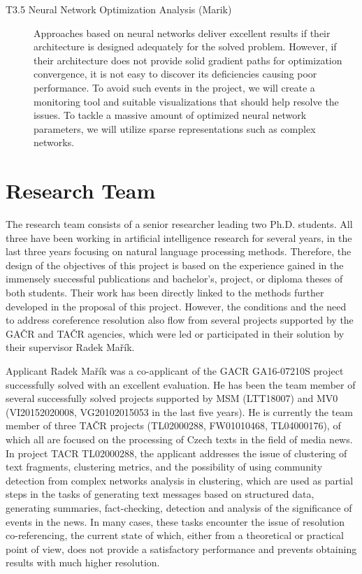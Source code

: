 \begin{description}
	\item [T3.5 Neural Network Optimization Analysis  (Marik)] Approaches based on neural networks deliver excellent results if their architecture is designed adequately for the solved problem. However, if their architecture does not provide solid gradient paths for optimization convergence, it is not easy to discover its deficiencies causing poor performance. To avoid such events in the project, we will create a monitoring tool and suitable visualizations that should help resolve the issues. To tackle a massive amount of optimized neural network parameters, we will utilize sparse representations such as complex networks.

\end{description}


\section{Research Team}\label{sec:research_team}

The research team consists of a senior researcher leading two Ph.D. students. All three have been working in artificial intelligence research for several years, in the last three years focusing on natural language processing methods. Therefore, the design of the objectives of this project is based on the experience gained in the immensely successful publications and bachelor's, project, or diploma theses of both students. Their work has been directly linked to the methods further developed in the proposal of this project. However, the conditions and the need to address coreference resolution also flow from several projects supported by the GAČR and TAČR agencies, which were led or participated in their solution by their supervisor Radek Mařík.

Applicant Radek Mařík was a co-applicant of the GACR GA16-07210S project successfully solved with an excellent evaluation. He has been the team member of several successfully solved projects supported by MSM (LTT18007) and MV0 (VI20152020008, VG20102015053 in the last five years). He is currently the team member of three TAČR projects (TL02000288, FW01010468, TL04000176), of which all are focused on the processing of Czech texts in the field of media news. In project TACR TL02000288, the applicant addresses the issue of clustering of text fragments, clustering metrics, and the possibility of using community detection from complex networks analysis in clustering, which are used as partial steps in the tasks of generating text messages based on structured data, generating summaries, fact-checking, detection and analysis of the significance of events in the news. In many cases, these tasks encounter the issue of resolution co-referencing, the current state of which, either from a theoretical or practical point of view, does not provide a satisfactory performance and prevents obtaining results with much higher resolution.

